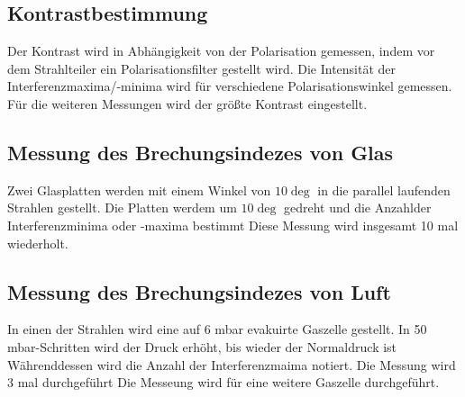 \subsection{Kontrastbestimmung}%
Der Kontrast wird in Abhängigkeit von der Polarisation gemessen,
indem vor dem Strahlteiler ein Polarisationsfilter gestellt wird.
Die Intensität der Interferenzmaxima/-minima wird für verschiedene Polarisationswinkel gemessen.
\newline \newline
\noindent Für die weiteren Messungen wird der größte Kontrast eingestellt.

\subsection{Messung des Brechungsindezes von Glas}%
Zwei Glasplatten werden mit einem Winkel von $10\deg$ 
in die parallel laufenden Strahlen gestellt.
Die Platten werdem um $10\deg$ gedreht und die Anzahlder Interferenzminima  oder -maxima bestimmt
Diese Messung wird insgesamt 10 mal wiederholt.

\subsection{Messung des Brechungsindezes von Luft}%
In einen der Strahlen wird eine auf 6 mbar evakuirte Gaszelle gestellt.
In 50 mbar-Schritten wird der Druck erhöht, bis wieder der Normaldruck ist
Währenddessen wird die Anzahl der Interferenzmaima notiert.
Die Messung wird 3 mal durchgeführt
\newline \newline
\noindent Die Messeung wird für eine weitere Gaszelle durchgeführt.
